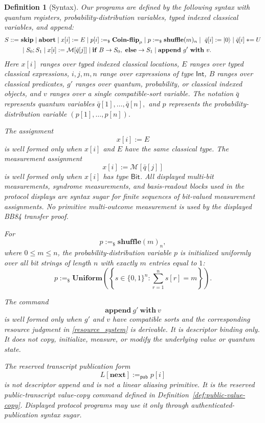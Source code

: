 \documentclass[acmsmall,screen,review,anonymous,nonacm]{acmart}
\newtheorem{definition}{Definition}[section]
\theoremstyle{defn_style}
\newcommand{\asteq}{\mathrel{*}=}
\begin{document}
\begin{definition}[Syntax]
Our programs are defined by the following syntax with quantum registers,
probability-distribution variables, typed indexed classical variables, and append:
\begin{align*}
    S ::=~&
    \textbf{skip}
    \mid \textbf{abort}
    \mid x[i] := E
    \mid p[i] :=_\$ \textbf{Coin-flip}_{\mu}
    \mid p :=_\$ \textbf{shuffle}(m)_{n}
    \mid~ \bar q[i] := \ket{0}
    \mid \bar q[i] \asteq U
    \\
    &\mid S_0;S_1
    \mid x[i] := \mathcal{M}[\bar q[j]]
    \mid
    \textbf{if } B \rightarrow S_0,\ \textbf{else}\rightarrow S_1
    \mid\mathbf{append}\ g'\ \mathbf{with}\ v .
\end{align*}
Here \(x[i]\) ranges over typed indexed classical locations, \(E\) ranges over
typed classical expressions, \(i,j,m,n\) range over expressions of type
\(\mathsf{Int}\), \(B\) ranges over classical predicates, \(g'\) ranges over
quantum, probability, or classical indexed objects, and \(v\) ranges over a
single compatible-sort variable.
The notation \(\bar q\) represents quantum variables
\(
\bar q[1],\ldots,\bar q[n],
\)
and \(p\) represents the probability-distribution variable
\(
(p[1],\ldots,p[n]).
\)

The assignment
\[
x[i]:=E
\]
is well formed only when \(x[i]\) and \(E\) have the same classical type. The
measurement assignment
\[
x[i]:=\mathcal M[\bar q[j]]
\]
is well formed only when \(x[i]\) has type \(\mathsf{Bit}\). All displayed multi-bit measurements, syndrome measurements, and basis-readout
blocks used in the protocol displays are syntax sugar for finite sequences of
bit-valued measurement assignments. No primitive multi-outcome measurement is
used by the displayed BB84 transfer proof.

For
\[
p:=_\$ \textbf{shuffle}(m)_{n},
\]
where \(0\le m\le n\), the probability-distribution variable \(p\) is
initialized uniformly over all bit strings of length \(n\) with exactly \(m\)
entries equal to \(1\):
\[
p:=_\$
\textbf{Uniform}
\left(
\left\{
s\in\{0,1\}^{n}
:
\sum_{r=1}^{n}s[r]=m
\right\}
\right).
\]

The command
\[
\mathbf{append}\ g'\ \mathbf{with}\ v
\]
is well formed only when \(g'\) and \(v\) have compatible sorts and the
corresponding resource judgment in \ref{resource_system} is derivable. It is descriptor
binding only. It does not copy, initialize, measure, or modify the underlying
value or quantum state.

The reserved transcript publication form
\[
L[\mathbf{next}] :=_{\mathsf{pub}} p[i]
\]
is not descriptor append and is not a linear aliasing primitive. It is the
reserved public-transcript value-copy command defined in
Definition~\ref{def:public-value-copy}. Displayed protocol programs may use it
only through authenticated-publication syntax sugar.


\end{definition}
\end{document}
